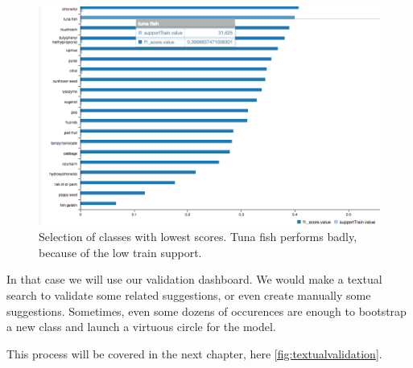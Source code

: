 \begin{figure}[H]
\centering
\includegraphics[scale=0.5]{./images/data-quality/islabeledby_support_score.png}
\caption{Selection of classes with lowest scores. Tuna fish performs badly, because of the low train support.}
\end{figure}

In that case we will use our validation dashboard. We would make a textual search to validate some related suggestions, or even create manually some suggestions. Sometimes, even some dozens of occurences are enough to bootstrap a new class and launch a virtuous circle for the model.

This process will be covered in the next chapter, here \ref{fig:textualvalidation}.


